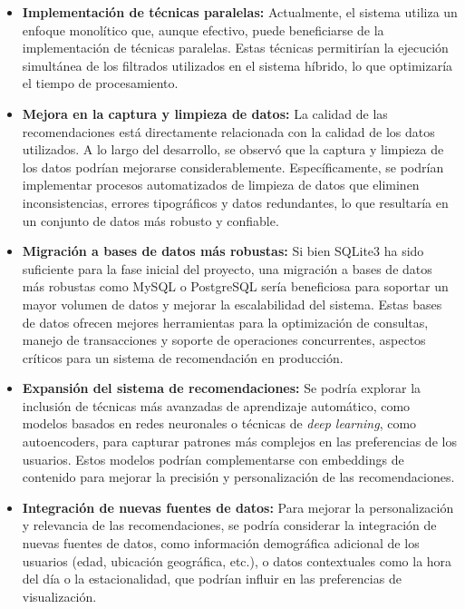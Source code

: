 \documentclass{llncs}
\begin{document}
	\begin{itemize}
		\item \textbf{Implementación de técnicas paralelas:} Actualmente, el sistema utiliza un enfoque monolítico que, aunque efectivo, puede beneficiarse de la implementación de técnicas paralelas. Estas técnicas permitirían la ejecución simultánea de los filtrados utilizados en el sistema híbrido, lo que optimizaría el tiempo de procesamiento.
		
		\item \textbf{Mejora en la captura y limpieza de datos:} La calidad de las recomendaciones está directamente relacionada con la calidad de los datos utilizados. A lo largo del desarrollo, se observó que la captura y limpieza de los datos podrían mejorarse considerablemente. Específicamente, se podrían implementar procesos automatizados de limpieza de datos que eliminen inconsistencias, errores tipográficos y datos redundantes, lo que resultaría en un conjunto de datos más robusto y confiable.
		
		\item \textbf{Migración a bases de datos más robustas:} Si bien SQLite3 ha sido suficiente para la fase inicial del proyecto, una migración a bases de datos más robustas como MySQL o PostgreSQL sería beneficiosa para soportar un mayor volumen de datos y mejorar la escalabilidad del sistema. Estas bases de datos ofrecen mejores herramientas para la optimización de consultas, manejo de transacciones y soporte de operaciones concurrentes, aspectos críticos para un sistema de recomendación en producción.
		
		\item \textbf{Expansión del sistema de recomendaciones:} Se podría explorar la inclusión de técnicas más avanzadas de aprendizaje automático, como modelos basados en redes neuronales o técnicas de \textit{deep learning}, como autoencoders, para capturar patrones más complejos en las preferencias de los usuarios. Estos modelos podrían complementarse con embeddings de contenido para mejorar la precisión y personalización de las recomendaciones.
		
		\item \textbf{Integración de nuevas fuentes de datos:} Para mejorar la personalización y relevancia de las recomendaciones, se podría considerar la integración de nuevas fuentes de datos, como información demográfica adicional de los usuarios (edad, ubicación geográfica, etc.), o datos contextuales como la hora del día o la estacionalidad, que podrían influir en las preferencias de visualización.
		

\end{itemize}
\end{document}

